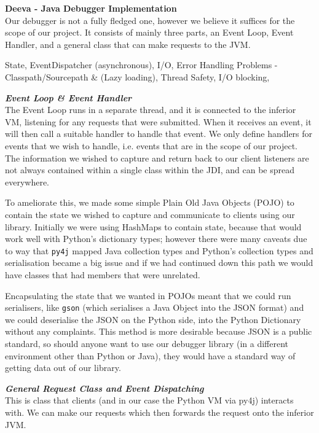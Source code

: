 \documentclass[11pt, a4paper]{article}
\begin{document}
\textbf{Deeva - Java Debugger Implementation}\\
Our debugger is not a fully fledged one, however we believe it suffices for the scope of our project.
It consists of mainly three parts, an Event Loop, Event Handler, and a general class that can make requests to the JVM.

State, EventDispatcher (asynchronous), I/O, Error Handling
Problems - Classpath/Sourcepath \& (Lazy loading), Thread Safety, I/O blocking, 

\textbf{\emph{Event Loop \& Event Handler}}\\
The Event Loop runs in a separate thread, and it is connected to the inferior VM, listening for any requests that were submitted.
When it receives an event, it will then call a suitable handler to handle that event.
We only define handlers for events that we wish to handle, i.e. events that are in the scope of our project.
The information we wished to capture and return back to our client listeners are not always contained within a single class within the JDI, and can be spread everywhere. 

To ameliorate this, we made some simple Plain Old Java Objects (POJO) to contain the state we wished to capture and communicate to clients using our library.
Initially we were using HashMaps to contain state, because that would work well with Python's dictionary types; however there were many caveats due to way that \texttt{py4j} mapped Java collection types and Python's collection types and serialisation became a big issue and if we had continued down this path we would have classes that had members that were unrelated.

Encapsulating the state that we wanted in POJOs meant that we could run serialisers, like \texttt{gson} (which serialises a Java Object into the JSON format) and we could deserialise the JSON on the Python side, into the Python Dictionary without any complaints.
This method is more desirable because JSON is a public standard, so should anyone want to use our debugger library (in a different environment other than Python or Java), they would have a standard way of getting data out of our library.


\textbf{\emph{General Request Class and Event Dispatching}}\\
This is class that clients (and in our case the Python VM via py4j) interacts with.
We can make our requests which then forwards the request onto the inferior JVM.
\end{document}
